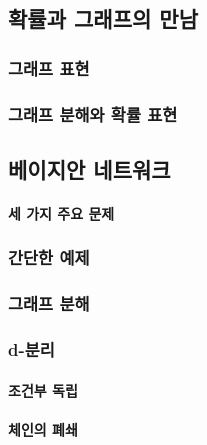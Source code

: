 \documentclass [12pt] {oblivoir}
\let\oldsubsubsection=\subsubsection
\renewcommand{\subsubsection}
{
  \filbreak
  \oldsubsubsection
}
\begin{document}
\subsection{확률과 그래프의 만남}

\subsubsection{그래프 표현}

\subsubsection{그래프 분해와 확률 표현}

\subsection{베이지안 네트워크}

\paragraph*{세 가지 주요 문제}\mbox{}

\vspace{3mm}

\subsubsection{간단한 예제}

\subsubsection{그래프 분해}

\subsubsection{d-분리}

\paragraph*{조건부 독립}\mbox{}

\vspace{3mm}

\paragraph*{체인의 폐쇄}\mbox{}

\vspace{3mm}
\end{document}

